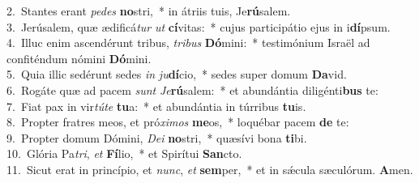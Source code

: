 {2.~}Stantes erant \textit{pe}\textit{des} \textbf{no}stri,~* in átriis tuis, Je\textbf{rú}salem.\\
{3.~}Jerúsalem, quæ ædificá\textit{tur} \textit{ut} \textbf{cí}vitas:~* cujus participátio ejus in i\textbf{dí}psum.\\
{4.~}Illuc enim ascendérunt tribus, \textit{tri}\textit{bus} \textbf{Dó}mini:~* testimónium Israël ad confiténdum nómini \textbf{Dó}mini.\\
{5.~}Quia illic sedérunt sedes \textit{in} \textit{ju}\textbf{dí}cio,~* sedes super domum \textbf{Da}vid.\\
{6.~}Rogáte quæ ad pacem \textit{sunt} \textit{Je}\textbf{rú}salem:~* et abundántia diligénti\textbf{bus} te:\\
{7.~}Fiat pax in vir\textit{tú}\textit{te} \textbf{tu}a:~* et abundántia in túrribus \textbf{tu}is.\\
{8.~}Propter fratres meos, et pró\textit{xi}\textit{mos} \textbf{me}os,~* loquébar pacem \textbf{de} te:\\
{9.~}Propter domum Dómini, \textit{De}\textit{i} \textbf{no}stri,~* quæsívi bona \textbf{ti}bi.\\
{10.~}Glória Pa\textit{tri}, \textit{et} \textbf{Fí}lio,~* et Spirítui \textbf{San}cto.\\
{11.~}Sicut erat in princípio, et \textit{nunc}, \textit{et} \textbf{sem}per,~* et in sǽcula sæculórum. \textbf{A}men.\\
